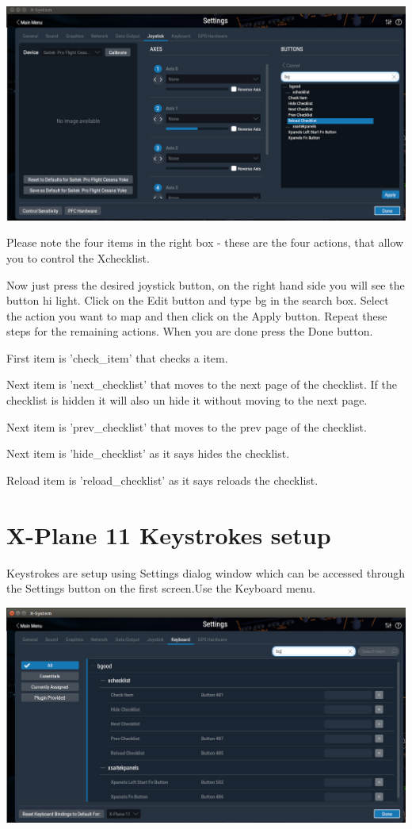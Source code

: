 \documentclass[11pt,parskip=half,a4paper]{scrartcl}
\begin{document}
\begin{center}
\includegraphics[width=17cm]{XchecklistUserManual-img003.png}
\end{center}

Please note the four items in the right box - these are the four actions, that allow you to control the 
Xchecklist. 

Now just press the desired joystick button, on the right hand side you will see the button hi light. Click on the Edit button and type bg in the search box. Select the action you want to map and then click on the Apply button. Repeat these steps for the remaining actions. When you are done press the Done button.

First item is 'check\_item' that checks a item. 

Next item is 'next\_checklist' that moves to the next page of the checklist. If the checklist is hidden it 
will also un hide it without moving to the next page. 

Next item is 'prev\_checklist' that moves to the prev page of the checklist.

Next item is 'hide\_checklist' as it says hides the checklist.

Reload item is 'reload\_checklist' as it says reloads the checklist.


\newpage
\section{X-Plane 11 Keystrokes setup}

Keystrokes are setup using Settings dialog window which can be accessed through the Settings button on the first screen.Use the Keyboard menu.

\begin{center}
\includegraphics[width=17cm]{XchecklistUserManual-img004.png}
\end{center}
\end{document}
